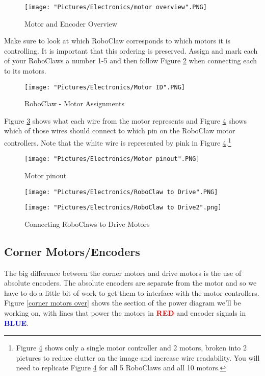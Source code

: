 \documentclass[12pt]{article}
\begin{document}
\begin{figure}[H]
  	\centering
    	\texttt{[image: "Pictures/Electronics/motor overview".PNG]}
 	\caption{Motor and Encoder Overview}
	\label{motors over}
\end{figure}


\noindent Make sure to look at which RoboClaw corresponds to which motors it is controlling. It is important that this ordering is preserved. Assign and mark each of your RoboClaws a number 1-5 and then follow Figure \ref{motorID} when connecting each to its motors. 

\begin{figure}[H]
 	\centering
	\texttt{[image: "Pictures/Electronics/Motor ID".PNG]}
 	\caption{RoboClaw - Motor Assignments}
	\label{motorID}
\end{figure}

Figure \ref{Motor pinout} shows what each wire from the motor represents and Figure \ref{RC to Drive} shows which of those wires should connect to which pin on the RoboClaw motor controllers. Note that the white wire is represented by pink in Figure \ref{RC to Drive}.\footnote{Figure \ref{RC to Drive} shows only a single motor controller and 2 motors, broken into 2 pictures to reduce clutter on the image and increase wire readability. You will need to replicate Figure \ref{RC to Drive} for all 5 RoboClaws and all 10 motors.} 

\begin{figure}[H]
 	\centering
	\texttt{[image: "Pictures/Electronics/Motor pinout".PNG]}
 	\caption{Motor pinout}
	\label{Motor pinout}
\end{figure}


\begin{figure}[H]
 	\centering
  	\begin{minipage}[b]{0.475\textwidth}
		\texttt{[image: "Pictures/Electronics/RoboClaw to Drive".PNG]}
  	\end{minipage}
  	\hfill
  	\begin{minipage}[b]{0.425\textwidth}
    		\texttt{[image: "Pictures/Electronics/RoboClaw to Drive2".png]}
  	\end{minipage}
	\caption{Connecting RoboClaws to Drive Motors}
	\label{RC to Drive}
\end{figure}

\subsection{Corner Motors/Encoders}
The big difference between the corner motors and drive motors is the use of absolute encoders. The absolute encoders are separate from the motor and so we have to do a little bit of work to get them to interface with the motor controllers. Figure \ref{corner motors over} shows the section of the power diagram we'll be working on, with lines that power the motors in \textcolor{red}{\textbf{RED}} and encoder signals in \textcolor{blue}{\textbf{BLUE}}.
\end{document}
